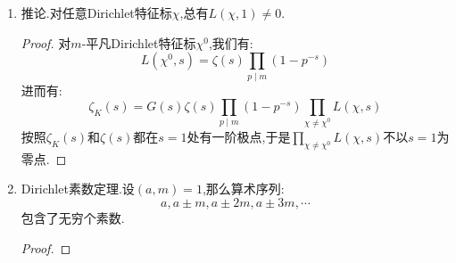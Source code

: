 \begin{enumerate}
\begin{proof}
    	固定素数$p$,设$p=(\mathfrak{p}_1\cdots\mathfrak{p}_r)^e$是素数$p$在$K$中的分解.设惯性次数为$f$,也即$\mathfrak{R}(\mathfrak{p}_i)=p^f$.那么$\zeta_K(s)$就包含乘积因子:
    	$$\prod_{\mathfrak{p}\mid p}(1-\mathfrak{R}(\mathfrak{p})^{-s})^{-1}=(1-p^{-fs})^{-r}$$
    	而$\prod_{\chi}L(\chi,s)$有乘积因子:
    	$$\prod_{\chi}(1-\chi(p)p^{-s})^{-1}$$
    	当$p\mid m$时这个因子就是1,下面设$p\not\mid m$,此时$p^f\equiv1(\mathrm{mod}m)$,并且$e=1$,进而有$r=\varphi(m)/f$是$p$在$G=(\mathbb{Z}/m\mathbb{Z})^*$中生成的子群$G_p$的指数.定义$\widehat{G}$是$G$上特征标构成的群,那么$\chi\mapsto\chi(p)$是同构$\widehat{G_p}\cong\mu_f$,有如下短正合列:
    	$$\xymatrix{1\ar[r]&\widehat{G/G_p}\ar[r]&\widehat{G}\ar[r]&\mu_f\ar[r]&1}$$
    	进而在$\widehat{G}$中可以找到$r$个像为$\chi(p)$的特征标,进而有(对$p\not\mid m$):
    	\begin{align*}
    		\prod_{\chi}(1-\chi(p)p^{-s})^{-1}=\prod_{\zeta\in\mu_f}(1-\zeta p^{-s})^{-r}\\&=(1-p^{-fs})^{-r}\\&=\prod_{\mathfrak{p}\mid p}(1-\mathfrak{R}(\mathfrak{p})^{-s})^{-1}
    	\end{align*}
    	让$p$跑遍全部素数,乘积得到原等式.
    \end{proof}
    \item 推论.对任意Dirichlet特征标$\chi$,总有$L(\chi,1)\not=0$.
    \begin{proof}
    	
    	对$m$-平凡Dirichlet特征标$\chi^0$,我们有:
    	$$L(\chi^0,s)=\zeta(s)\prod_{p\mid m}(1-p^{-s})$$
    	进而有:
    	$$\zeta_K(s)=G(s)\zeta(s)\prod_{p\mid m}(1-p^{-s})\prod_{\chi\not=\chi^0}L(\chi,s)$$
    	按照$\zeta_K(s)$和$\zeta(s)$都在$s=1$处有一阶极点,于是$\prod_{\chi\not=\chi^0}L(\chi,s)$不以$s=1$为零点.
    \end{proof}
    \item Dirichlet素数定理.设$(a,m)=1$,那么算术序列:
    $$a,a\pm m,a\pm 2m,a\pm 3m,\cdots$$
    包含了无穷个素数.
    \begin{proof}
    	

\end{proof}
\end{enumerate}
